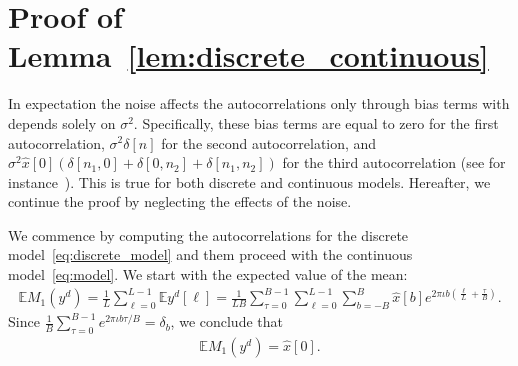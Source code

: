 \documentclass[english,12pt]{article}
\newcommand{\I}{\iota}
\newcommand{\tB}{B}
\newcommand{\hx}{\hat{x}}
\newcommand{\E}{\mathbb{E}}
\newcommand{\TODO}[1]{{\color{red}{[#1]}}}
\numberwithin{equation}{section}
\numberwithin{thm}{section} %
\begin{document}
 \TODO{Relation to 2-D Kam's method?}
	




\appendix

\section{Proof of Lemma~\ref{lem:discrete_continuous}}  
\label{sec:proof_lem:discrete_continuous}

In expectation the noise affects the autocorrelations only through bias terms with depends solely on $\sigma^2$. Specifically, these bias terms are equal to zero for the first autocorrelation, $\sigma^2\delta[n]$ for the second autocorrelation, and 
$\sigma^2\hat{x}[0](\delta[n_1,0]+\delta[0,n_2]+\delta[n_1,n_2])$ for the third autocorrelation (see for instance~\cite{bendory2017bispectrum}). This is true for both discrete and continuous models. Hereafter, we continue the proof by neglecting the effects of the noise.

We commence by computing the autocorrelations for the discrete model~\eqref{eq:discrete_model} and them proceed with the continuous model~\eqref{eq:model}.
We start with the expected value of the mean:
\begin{equation}
\begin{split}
\E M_1(y^d) =  \frac{1}{L} \sum_{\ell=0}^{L-1}\E y^d[\ell] =  \frac{1}{LB}\sum_{\tau=0}^{B-1}\sum_{\ell=0}^{L-1}
\sum_{b=-\tB}^{\tB}\hat{x}[b]e^{2\pi\I b \left(\frac{\ell}{L} + \frac{\tau}{B}\right) }.
\end{split}
\end{equation}
Since $\frac{1}{B}\sum_{\tau=0}^{B-1}e^{2\pi\I b \tau/B}=\delta_b$, we conclude that 
\begin{equation} \label{eq:mean}
\begin{split}
\E M_1(y^d) = \hx[0].
\end{split}
\end{equation}
\end{document}
